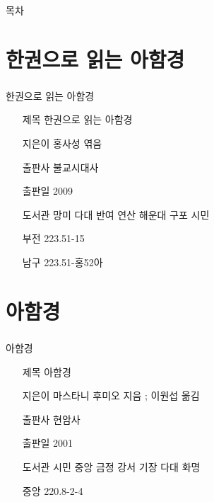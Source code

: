 \documentclass[aspectratio=1610,17pt,xcolor=pdftex,dvipsnames,table,handout]{beamer}
\begin{document}
		\begin{frame} [plain]{목차}
		\tableofcontents%
		\end{frame}


		\section{ 한권으로 읽는 아함경 }
		\begin{frame} [t,plain]
		\frametitle{}
			\begin{block} { 한권으로 읽는 아함경 }
			\setlength{\leftmargini}{4em}			
			\begin{itemize}
				\item [제목]  	한권으로 읽는 아함경 
				\item [지은이]	홍사성 엮음
				\item [출판사]	불교시대사
				\item [출판일]	2009

				\item [도서관] 	망미 다대 반여 연산 해운대 구포 시민 
				\item [부전]		223.51-15
				\item [남구]		223.51-홍52아
			\end{itemize}
			\end{block}						
		\end{frame}						


		\section{ 아함경 }
		\begin{frame} [t,plain]
		\frametitle{}
			\begin{block} { 아함경 }
			\setlength{\leftmargini}{4em}			
			\begin{itemize}
				\item [제목]  	아함경 
				\item [지은이]	마스타니 후미오 지음 ; 이원섭 옮김
				\item [출판사]	현암사
				\item [출판일]	2001

				\item [도서관] 	시민 중앙 금정 강서 기장 다대 화명
				\item [중앙]		220.8-2-4
			\end{itemize}
			\end{block}						
		\end{frame}						
\end{document}
